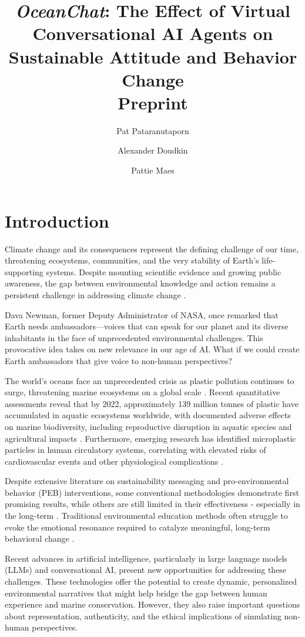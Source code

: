 \documentclass[sigconf, nonacm]{acmart}
\title{\textit{OceanChat}: The Effect of Virtual Conversational AI Agents on Sustainable Attitude and Behavior Change \\ \vspace{0.2cm} \large{\textbf{Preprint}}}
\author{Pat Pataranutaporn}
\affiliation{
  \institution{MIT Media Lab}
  \institution{Massachusetts Institute of Technology (MIT)}
  \city{Cambridge}
  \state{MA}
  \country{USA}
}
\author{Alexander Doudkin}
\affiliation{
  \institution{MIT Media Lab}
  \institution{Massachusetts Institute of Technology (MIT)}
  \city{Cambridge}
  \state{MA}
  \country{USA}
}
\author{Pattie Maes}
\affiliation{
  \institution{MIT Media Lab}
  \institution{Massachusetts Institute of Technology (MIT)}
  \city{Cambridge}
  \state{MA}
  \country{USA}
}
\begin{document}
\maketitle

\section{Introduction}
Climate change and its consequences represent the defining challenge of our time, threatening ecosystems, communities, and the very stability of Earth's life-supporting systems. Despite mounting scientific evidence and growing public awareness, the gap between environmental knowledge and action remains a persistent challenge in addressing climate change \cite{Knutti2019}.

Dava Newman, former Deputy Administrator of NASA, once remarked that Earth needs ambassadors—voices that can speak for our planet and its diverse inhabitants in the face of unprecedented environmental challenges. This provocative idea takes on new relevance in our age of AI. What if we could create Earth ambassadors that give voice to non-human perspectives?

The world's oceans face an unprecedented crisis as plastic pollution continues to surge, threatening marine ecosystems on a global scale  \cite{Geyer2017}. Recent quantitative assessments reveal that by 2022, approximately 139 million tonnes of plastic have accumulated in aquatic ecosystems worldwide, with documented adverse effects on marine biodiversity, including reproductive disruption in aquatic species and agricultural impacts \cite{Cole2011, Meszaros2023, OECD2022a, OECD2022b}. Furthermore, emerging research has identified microplastic particles in human circulatory systems, correlating with elevated risks of cardiovascular events and other physiological complications \cite{Marfella2024}. 

Despite extensive literature on sustainability messaging and pro-environmental behavior (PEB) interventions, some conventional methodologies demonstrate first promising results, while others are still limited in their effectiveness - especially in the long-term \cite{Hadler2022, Nguyen2019, Cavaliere2020}. Traditional environmental education methods often struggle to evoke the emotional resonance required to catalyze meaningful, long-term behavioral change \cite{Markowitz2018}.

Recent advances in artificial intelligence, particularly in large language models (LLMs) and conversational AI, present new opportunities for addressing these challenges. These technologies offer the potential to create dynamic, personalized environmental narratives that might help bridge the gap between human experience and marine conservation. However, they also raise important questions about representation, authenticity, and the ethical implications of simulating non-human perspectives.
\end{document}
